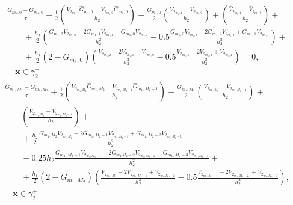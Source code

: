 \documentclass[a4paper]{article}
\theoremstyle{definition}
\numberwithin{equation}{section}
\begin{document}
\newpage
\begin{eqnarray} \nonumber
& \frac{\hat{G}_{m_1,0} - G_{m_1,0}}{\tau} +  \frac{1}{2} \left(  \frac{V_{2_{m_1,1}}\hat{G}_{m_1,1} - V_{2_{m_1,0}}\hat{G}_{m_1,0}}{h_2}\right) - \frac{G_{m_1,0}}{2}\left(\frac{V_{2_{m_1,1}} - V_{2_{m_1,0}}}{h_2} \right) + \left( \frac{\hat{V}_{2_{m_1,1}} - \hat{V}_{2_{m_1,0}}}{h_2} \right) + \\ \nonumber
& \qquad + \frac{h_2}{2}\left( \frac{G_{m_1,2}V_{2_{m_1,2}} - 2G_{m_1,1}V_{2_{m_1,1}} + G_{m_1,0}V_{2_{m_1,0}}}{h_2^2} - 0.5\frac{G_{m_1,3}V_{2_{m_1,3}} - 2G_{m_1,2}V_{2_{m_1,2}} + G_{m_1,1}V_{2_{m_1,1}}}{h_2^2} \right) + \\ 
& \qquad + \frac{h_2}{2}(2-G_{m_1,0})\left( \frac{V_{2_{m_1,2}} - 2V_{2_{m_1,1}} + V_{1_{m_1,0}}}{h_2^2} - 0.5\frac{V_{2_{m_1,3}} - 2V_{2_{m_1,2}} + V_{2_{m_1,1}}}{h_2^2} \right)=0, \\ \nonumber
& \quad \textbf{x}\in\gamma_2^-
\end{eqnarray}
\begin{eqnarray}\nonumber
& \frac{\hat{G}_{m_1,M_2} - G_{m_1,M_2}}{\tau} +  \frac{1}{2} \left( \frac{V_{2_{m_1,M_2}}\hat{G}_{m_1,M_2} - V_{2_{m_1,M_2-1}}\hat{G}_{m_1,M_2-1}}{h_2}\right) - \frac{G_{m_1,M_2}}{2}\left(\frac{V_{2_{m_1,M_2}} - V_{2_{m_1,M_2-1}}}{h_2} \right) + \\ \nonumber
& \qquad \left( \frac{\hat{V}_{2_{m_1,M_2}} - \hat{V}_{2_{m_1,M_2-1}}}{h_2} \right) + \\
& \qquad + \frac{h_2}{2} \frac{G_{m_1,M_2}V_{2_{m_1,M_2}} - 2G_{m_1,M_2-1}V_{2_{m_1,M_2-1}} + G_{m_1,M_2-2}V_{2_{m_1,M_2-2}}}{h_2^2} - \\ \nonumber
& \qquad - 0.25h_2\frac{G_{m_1,M_2-1}V_{2_{m_1,M_2-1}} - 2G_{m_1M_2-2}V_{2_{m_1,M_2-2}} + G_{m_1,M_2-3}V_{2_{m_1,M_2-3}}}{h_2^2}  + \\ \nonumber
& \qquad + \frac{h_1}{2}(2-G_{m_1,M_2})\left( \frac{V_{2_{m_1,M_2}} - 2V_{2_{m_1,M_2-1}} + V_{2_{m_1,M_2-2}}}{h_2^2} - 0.5\frac{V_{2_{m_1,M_2-1}} - 2V_{2_{m_1,M_2-2,}} + V_{2_{m_1,M_2-3}}}{h_2^2} \right), \\ \nonumber
& \quad \textbf{x}\in\gamma_2^+
\end{eqnarray}
\end{document}
